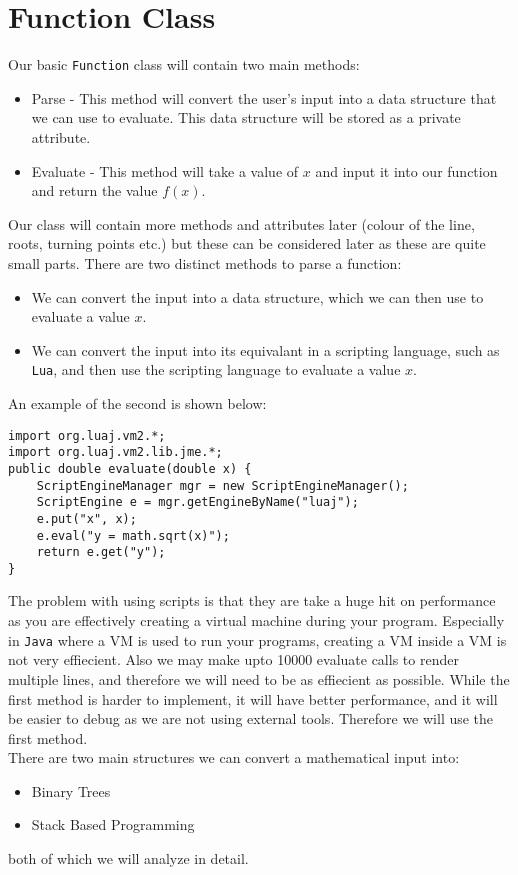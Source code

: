 \documentclass[../../../../main.tex]{subfiles}
\begin{document}
\section{Function Class}	\label{funcClass}
Our basic \texttt{Function} class will contain two main methods:
\begin{itemize}
	\item Parse - This method will convert the user's input into a data structure that we can use to evaluate. This data structure will be stored as a private attribute.
	\item Evaluate - This method will take a value of $x$ and input it into our function and return the value $f(x)$.
\end{itemize}
Our class will contain more methods and attributes later (colour of the line, roots, turning points etc.) but these can be considered later as these are quite small parts. There are two distinct methods to parse a function:
\begin{itemize}
	\item We can convert the input into a data structure, which we can then use to evaluate a value $x$.
	\item We can convert the input into its equivalant in a scripting language, such as \texttt{Lua\cite{lua}}, and then use the scripting language to evaluate a value $x$.
\end{itemize}
An example of the second is shown below:
\begin{verbatim}
import org.luaj.vm2.*;
import org.luaj.vm2.lib.jme.*;
public double evaluate(double x) {
	ScriptEngineManager mgr = new ScriptEngineManager();
	ScriptEngine e = mgr.getEngineByName("luaj");
	e.put("x", x);
	e.eval("y = math.sqrt(x)");
	return e.get("y");	
}
\end{verbatim}
The problem with using scripts is that they are take a huge hit on performance as you are effectively creating a virtual machine during your program. Especially in \texttt{Java} where a VM is used to run your programs, creating a VM inside a VM is not very effiecient. Also we may make upto 10000 evaluate calls to render multiple lines, and therefore we will need to be as effiecient as possible. While the first method is harder to implement, it will have better performance, and it will be easier to debug as we are not using external tools. Therefore we will use the first method.\\
There are two main structures we can convert a mathematical input into:
\begin{itemize}
	\item Binary Trees
	\item Stack Based Programming
\end{itemize}
both of which we will analyze in detail.
\newpage
\end{document}
